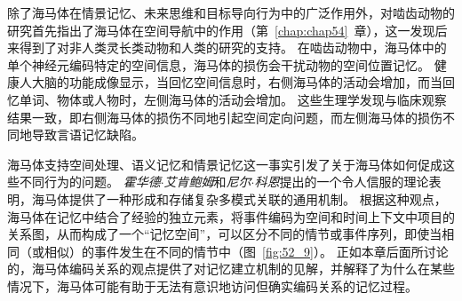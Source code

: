 除了海马体在情景记忆、未来思维和目标导向行为中的广泛作用外，对啮齿动物的研究首先指出了海马体在空间导航中的作用（第~\ref{chap:chap54}~章），这一发现后来得到了对非人类灵长类动物和人类的研究的支持。
在啮齿动物中，海马体中的单个神经元编码特定的空间信息，海马体的损伤会干扰动物的空间位置记忆。
健康人大脑的功能成像显示，当回忆空间信息时，右侧海马体的活动会增加，而当回忆单词、物体或人物时，左侧海马体的活动会增加。
这些生理学发现与临床观察结果一致，即右侧海马体的损伤不同地引起空间定向问题，而左侧海马体的损伤不同地导致言语记忆缺陷。


海马体支持空间处理、语义记忆和情景记忆这一事实引发了关于海马体如何促成这些不同行为的问题。
\textit{霍华德$\cdot$艾肯鲍姆}和\textit{尼尔$\cdot$科恩}提出的一个令人信服的理论表明，海马体提供了一种形成和存储复杂多模式关联的通用机制。
根据这种观点，海马体在记忆中结合了经验的独立元素，将事件编码为空间和时间上下文中项目的关系图，从而构成了一个“记忆空间”，可以区分不同的情节或事件序列，即使当相同（或相似）的事件发生在不同的情节中（图~\ref{fig:52_9}）。
正如本章后面所讨论的，海马体编码关系的观点提供了对记忆建立机制的见解，并解释了为什么在某些情况下，海马体可能有助于无法有意识地访问但确实编码关系的记忆过程。



